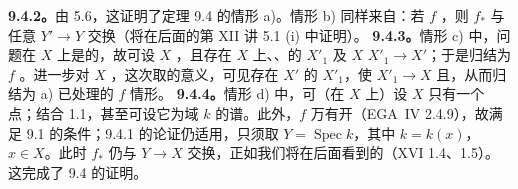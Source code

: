 \textbf{9.4.2。}由 5.6，这证明了定理 9.4 的情形 a)。情形 b) 同样来自：若 $f$ ，则 $f_*$ 与任意 $Y'\to Y$ 交换（将在后面的第 XII 讲 5.1 (i) 中证明）。
\textbf{9.4.3。}情形 c) 中，问题在 $X$ 上是的，故可设 $X$ ，且存在 $X$ 上、、的 $X'_1$ 及 $X$  $X'_1\to X'$；于是归结为 $f$ 。进一步对 $X$ ，这次取的意义，可见存在 $X'$ 的 $X'_1$，使 $X'_1\to X$ 且，从而归结为 a) 已处理的 $f$ 情形。
\textbf{9.4.4。}情形 d) 中，可（在 $X$ 上）设 $X$ 只有一个点；结合 1.1，甚至可设它为域 $k$ 的谱。此外，$f$ 万有开（EGA~IV 2.4.9），故满足 9.1 的条件；9.4.1 的论证仍适用，只须取 $Y=\operatorname{Spec}k$，其中 $k=k(x)$，$x\in X$。此时 $f_*$ 仍与 $Y\to X$ 交换，正如我们将在后面看到的（XVI 1.4、1.5）。
这完成了 9.4 的证明。
